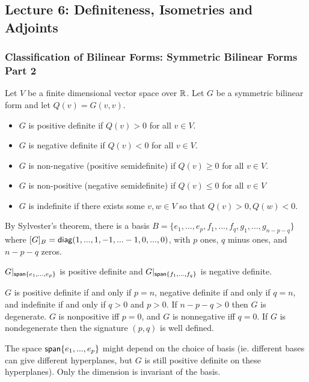 \subsection{Lecture 6: Definiteness, Isometries and Adjoints}
\subsubsection{Classification of Bilinear Forms: Symmetric Bilinear Forms Part 2}
\begin{defn}
Let $V$ be a finite dimensional vector space over $\operatorname{\mathbb{R}}$. Let $G$ be a symmetric bilinear form and let $Q(v)=G(v,v)$. 
    \begin{itemize}
    \item {
    $G$ is positive definite if $Q(v)>0$ for all $v\in V$.
    }
    \item {
    $G$ is negative definite if $Q(v)<0$ for all $v\in V$.
    }
    \item {
    $G$ is non-negative (positive semidefinite) if $Q(v)\geq 0$ for all $v\in V$.
    }
    \item {
    $G$ is non-positive (negative semidefinite) if $Q(v)\leq 0$ for all $v\in V$
    }
    \item {
    $G$ is indefinite if there exists some $v,w\in V$ so that $Q(v)>0, Q(w)<0$. 
    }
    \end{itemize}
\end{defn}

By Sylvester's theorem, there is a basis $B = \{e_1,...,e_p,f_1,...,f_q,g_1,...,g_{n-p-q}\}$ where $[G]_B = \operatorname{\textsf{diag}}(1,...,1,-1,...-1,0,...,0)$, with $p$ ones, $q$ minus ones, and $n-p-q$ zeros. 
\begin{remark*}
    $G|_{\operatorname{\textsf{span}}\{e_1,...,e_p\}}$ is positive definite and
    $G|_{\operatorname{\textsf{span}}\{f_1,...,f_q\}}$ is negative definite.
\end{remark*}
\begin{remark*}
    $G$ is positive definite if and only if $p=n$, negative definite if and only if $q=n$, and indefinite if and only if $q>0$ and $p>0$. If $n-p-q>0$ then $G$ is degenerate. $G$ is nonpositive iff $p=0$, and $G$ is nonnegative iff $q=0$. If $G$ is nondegenerate then the signature $(p,q)$ is well defined.
\end{remark*}
\begin{remark*}
    The space $\operatorname{\textsf{span}}\{e_1,...,e_p\}$ might depend on the choice of basis (ie. different bases can give different hyperplanes, but $G$ is still positive definite on these hyperplanes). Only the dimension is invariant of the basis.
\end{remark*}

